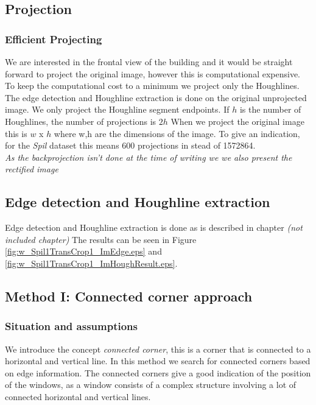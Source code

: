 
\subsection{Projection}

\subsubsection{Efficient Projecting} 
We are interested in the frontal view of the building and it would be straight
forward to project the original image, however this is computational
expensive. To keep the computational cost to a minimum we project only the
Houghlines. The edge detection and Houghline extraction is done on the original
unprojected image. We only project the Houghline segment
endpoints. If $h$ is the number of Houghlines, the number of projections is $2h$
When we project the original image this is $w$ x $h$ where w,h are the dimensions of
the image. To give an indication, for the \emph{Spil} dataset %
this means 600 projections in stead of 1572864.\\
\emph{As the backprojection isn't done at the time of writing we 
we also present the rectified image}


\subsection{Edge detection and Houghline extraction}
Edge detection and Houghline extraction is done as is described in chapter 
\emph{(not included chapter)} %
The results can be seen in Figure \ref{fig:w_Spil1TransCrop1_ImEdge.eps} and
\ref{fig:w_Spil1TransCrop1_ImHoughResult.eps}.


\subsection{Method I: Connected corner approach} 

\subsubsection{Situation and assumptions}
We introduce the concept \emph{connected corner}, this is a corner that is 
connected to a horizontal and vertical line.  
In this method we search for connected corners based on edge information.
The connected corners give a good indication of the position of the windows, as 
a window consists of a complex structure involving a lot of connected horizontal
and vertical lines. 

